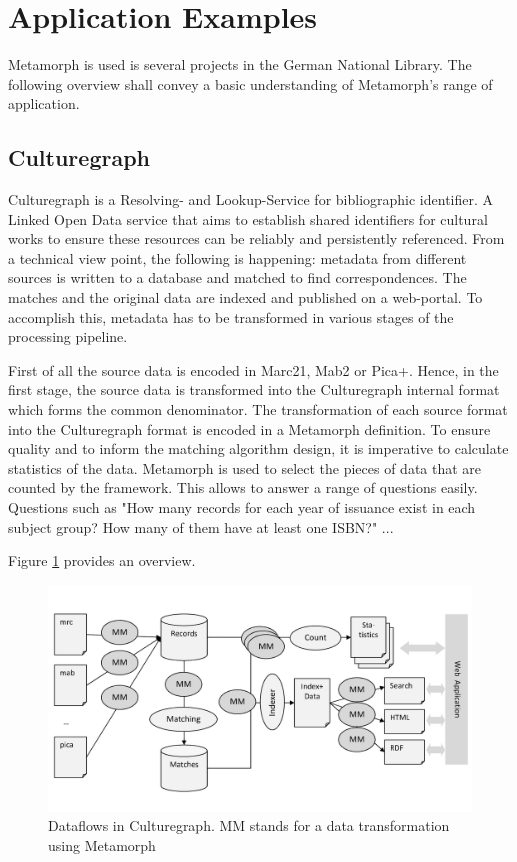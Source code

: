 \documentclass[12pt,a4paper]{article}
\begin{document}
\section{Application Examples}\label{apps}
 Metamorph is used is several projects in the German National Library. The following overview shall convey a basic understanding of Metamorph's range of application.

\subsection{Culturegraph}\label{culturegraph}
Culturegraph is a Resolving- and Lookup-Service for bibliographic identifier. A Linked Open Data service that aims to establish shared identifiers for cultural works to ensure these resources can be reliably and persistently referenced.
From a technical view point, the following is happening: metadata from different sources is written to a database and matched to find correspondences. The matches and the original data are indexed and published on a web-portal. To accomplish this, metadata has to be transformed in various stages of the processing pipeline.

First of all the source data is encoded in Marc21, Mab2 or Pica+. Hence, in the first stage, the source data is transformed into the Culturegraph internal format which forms the common denominator. The transformation of each source format into the Culturegraph format is encoded in a Metamorph definition. 
To ensure quality and to inform the matching algorithm design, it is imperative to calculate statistics of the data. Metamorph is used to select the pieces of data that are counted by the framework. This allows to answer a range of questions easily. Questions such as "How many records for each year of issuance exist in each subject group? How many of them have at least one ISBN?"
...

 Figure \ref{fig:flow} provides an overview.

\begin{figure}[htp]
\centering
\includegraphics[width=.96\textwidth]{figures/flow}
\caption{Dataflows in Culturegraph. MM stands for a data transformation using Metamorph}\label{fig:flow}
\end{figure}
\end{document}
